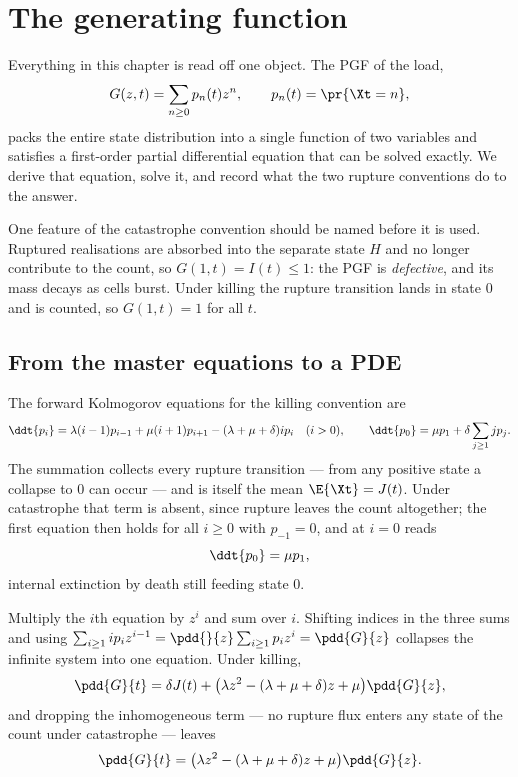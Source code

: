 \section{The generating function}
\label{dist:sec:pgf}

Everything in this chapter is read off one object. The PGF of the load,
\begin{equation}
G(z,t)=\sum_{n\ge0}p_n(t)z^n,\qquad p_n(t)=\pr{\Xt=n},
\label{dist:eq:gdef}
\end{equation}
packs the entire state distribution into a single function of two variables
and satisfies a first-order partial differential equation that can be solved
exactly. We derive that equation, solve it, and record what the two rupture
conventions do to the answer.

One feature of the catastrophe convention should be named before it is used.
Ruptured realisations are absorbed into the separate state $H$ and no longer
contribute to the count, so $G(1,t)=I(t)\le1$: the PGF is \emph{defective},
and its mass decays as cells burst. Under killing the rupture transition lands
in state $0$ and is counted, so $G(1,t)=1$ for all $t$.

\subsection{From the master equations to a PDE}
\label{dist:sec:masterpde}

The forward Kolmogorov equations for the killing convention are
\begin{equation}
\ddt{p_i} = \lambda (i-1) p_{i-1} + \mu (i+1) p_{i+1}
- (\lambda + \mu + \delta)ip_i \quad (i>0),
\qquad
\ddt{p_0} = \mu p_1 + \delta\sum_{j\ge1} jp_j.
\label{dist:eq:kolmogorov}
\end{equation}
The summation collects every rupture transition --- from any positive state a
collapse to $0$ can occur --- and is itself the mean $\E{\Xt}=J(t)$.
Under catastrophe that term is absent, since rupture leaves the count
altogether; the first equation then holds for all $i\ge0$ with $p_{-1}=0$, and
at $i=0$ reads
\begin{equation}
\ddt{p_0}=\mu p_1,
\label{dist:eq:kolmogorovcat}
\end{equation}
internal extinction by death still feeding state $0$.

Multiply the $i$th equation by $z^i$ and sum over $i$. Shifting indices in the
three sums and using
$\sum_{i\ge1}ip_iz^{i-1}=\pdd{}{z}\sum_{i\ge1}p_iz^{i}=\pdd{G}{z}$ collapses
the infinite system into one equation. Under killing,
\begin{equation}
\pdd{G}{t} = \delta J(t) +
\bigl(\lambda z^2 - (\lambda + \mu + \delta)z + \mu\bigr)\pdd{G}{z},
\label{dist:eq:killpde}
\end{equation}
and dropping the inhomogeneous term --- no rupture flux enters any state of
the count under catastrophe --- leaves
\begin{equation}
\pdd{G}{t} =
\bigl(\lambda z^2 - (\lambda + \mu + \delta)z + \mu\bigr)\pdd{G}{z}.
\label{dist:eq:catpde}
\end{equation}

